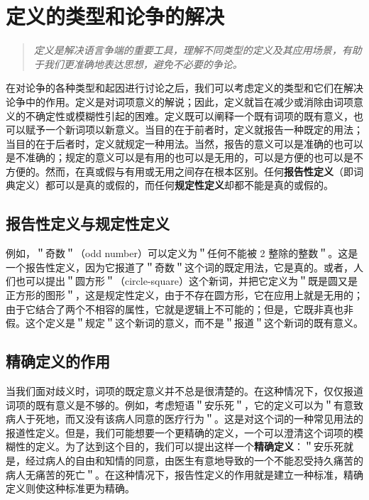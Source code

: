 \section{定义的类型和论争的解决}

\begin{quotation}
\textit{定义是解决语言争端的重要工具，理解不同类型的定义及其应用场景，有助于我们更准确地表达思想，避免不必要的争论。}
\end{quotation}

在对论争的各种类型和起因进行讨论之后，我们可以考虑定义的类型和它们在解决论争中的作用。定义是对词项意义的解说；因此，定义就旨在减少或消除由词项意义的不确定性或模糊性引起的困难。定义既可以阐释一个既有词项的既有意义，也可以赋予一个新词项以新意义。当目的在于前者时，定义就报告一种既定的用法；当目的在于后者时，定义就规定一种用法。当然，报告的意义可以是准确的也可以是不准确的；规定的意义可以是有用的也可以是无用的，可以是方便的也可以是不方便的。然而，在真或假与有用或无用之间存在根本区别。任何\textbf{报告性定义}（即词典定义）都可以是真的或假的，而任何\textbf{规定性定义}却都不能是真的或假的。

\subsection{报告性定义与规定性定义}

例如，＂奇数＂（odd number）可以定义为＂任何不能被 2 整除的整数＂。这是一个报告性定义，因为它报道了＂奇数＂这个词的既定用法，它是真的。或者，人们也可以提出＂圆方形＂（circle-square）这个新词，并把它定义为＂既是圆又是正方形的图形＂，这是规定性定义，由于不存在圆方形，它在应用上就是无用的；由于它结合了两个不相容的属性，它就是逻辑上不可能的；但是，它既非真也非假。这个定义是＂规定＂这个新词的意义，而不是＂报道＂这个新词的既有意义。

\subsection{精确定义的作用}

当我们面对歧义时，词项的既定意义并不总是很清楚的。在这种情况下，仅仅报道词项的既有意义是不够的。例如，考虑短语＂安乐死＂，它的定义可以为＂有意致病人于死地，而又没有该病人同意的医疗行为＂。这是对这个词的一种常见用法的报道性定义。但是，我们可能想要一个更精确的定义，一个可以澄清这个词项的模糊性的定义。为了达到这个目的，我们可以提出这样一个\textbf{精确定义}：＂安乐死就是，经过病人的自由和知情的同意，由医生有意地导致的一个不能忍受持久痛苦的病人无痛苦的死亡＂。在这种情况下，报告性定义的作用就是建立一种标准，精确定义则使这种标准更为精确。

